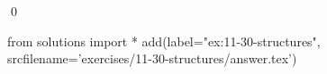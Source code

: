 
\begin{ex}
  \label{ex:11-30-structures}
  
  \qed
\end{ex}
\begin{python0}
from solutions import *
add(label="ex:11-30-structures",
    srcfilename='exercises/11-30-structures/answer.tex')
\end{python0}
